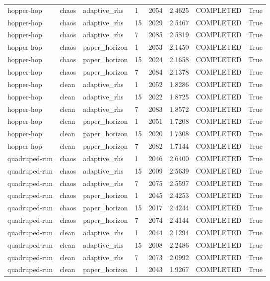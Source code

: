 \begin{tabular}{llllllll}
hopper-hop & chaos & adaptive\_rhs & 1 & 2054 & 2.4625 & COMPLETED & True \\
hopper-hop & chaos & adaptive\_rhs & 15 & 2029 & 2.5467 & COMPLETED & True \\
hopper-hop & chaos & adaptive\_rhs & 7 & 2085 & 2.5819 & COMPLETED & True \\
hopper-hop & chaos & paper\_horizon & 1 & 2053 & 2.1450 & COMPLETED & True \\
hopper-hop & chaos & paper\_horizon & 15 & 2024 & 2.1658 & COMPLETED & True \\
hopper-hop & chaos & paper\_horizon & 7 & 2084 & 2.1378 & COMPLETED & True \\
hopper-hop & clean & adaptive\_rhs & 1 & 2052 & 1.8286 & COMPLETED & True \\
hopper-hop & clean & adaptive\_rhs & 15 & 2022 & 1.8725 & COMPLETED & True \\
hopper-hop & clean & adaptive\_rhs & 7 & 2083 & 1.8572 & COMPLETED & True \\
hopper-hop & clean & paper\_horizon & 1 & 2051 & 1.7208 & COMPLETED & True \\
hopper-hop & clean & paper\_horizon & 15 & 2020 & 1.7308 & COMPLETED & True \\
hopper-hop & clean & paper\_horizon & 7 & 2082 & 1.7144 & COMPLETED & True \\
quadruped-run & chaos & adaptive\_rhs & 1 & 2046 & 2.6400 & COMPLETED & True \\
quadruped-run & chaos & adaptive\_rhs & 15 & 2009 & 2.5639 & COMPLETED & True \\
quadruped-run & chaos & adaptive\_rhs & 7 & 2075 & 2.5597 & COMPLETED & True \\
quadruped-run & chaos & paper\_horizon & 1 & 2045 & 2.4253 & COMPLETED & True \\
quadruped-run & chaos & paper\_horizon & 15 & 2017 & 2.4244 & COMPLETED & True \\
quadruped-run & chaos & paper\_horizon & 7 & 2074 & 2.4144 & COMPLETED & True \\
quadruped-run & clean & adaptive\_rhs & 1 & 2044 & 2.1294 & COMPLETED & True \\
quadruped-run & clean & adaptive\_rhs & 15 & 2008 & 2.2486 & COMPLETED & True \\
quadruped-run & clean & adaptive\_rhs & 7 & 2073 & 2.0992 & COMPLETED & True \\
quadruped-run & clean & paper\_horizon & 1 & 2043 & 1.9267 & COMPLETED & True \\

\end{tabular}
